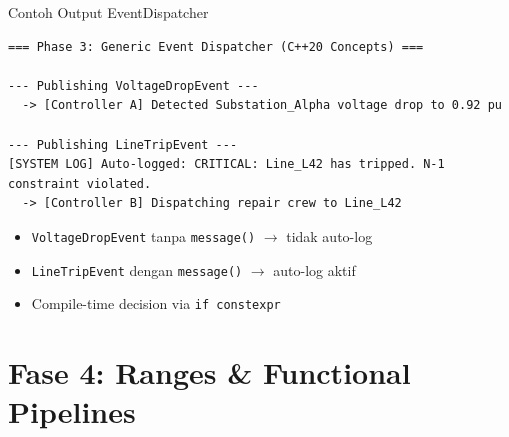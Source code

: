 \documentclass[aspectratio=169,10pt]{beamer}
\begin{document}
\begin{frame}[fragile]{Contoh Output EventDispatcher}
  \begin{verbatim}
=== Phase 3: Generic Event Dispatcher (C++20 Concepts) ===

--- Publishing VoltageDropEvent ---
  -> [Controller A] Detected Substation_Alpha voltage drop to 0.92 pu

--- Publishing LineTripEvent ---
[SYSTEM LOG] Auto-logged: CRITICAL: Line_L42 has tripped. N-1 constraint violated.
  -> [Controller B] Dispatching repair crew to Line_L42
  \end{verbatim}
  
  \vspace{0.3cm}
  \begin{itemize}
    \item \texttt{VoltageDropEvent} tanpa \texttt{message()} $\rightarrow$ tidak auto-log
    \item \texttt{LineTripEvent} dengan \texttt{message()} $\rightarrow$ auto-log aktif
    \item Compile-time decision via \texttt{if constexpr}
  \end{itemize}
\end{frame}

\section{Fase 4: Ranges \& Functional Pipelines}
\end{document}
